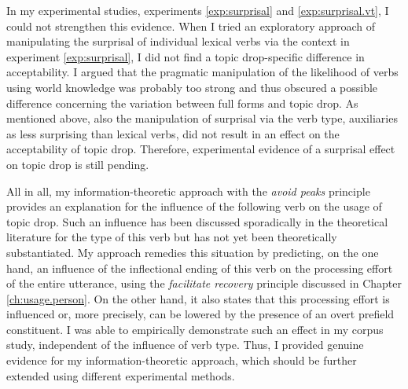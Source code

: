 In my experimental studies, experiments \ref*{exp:surprisal} and \ref*{exp:surprisal.vt}, I could not strengthen this evidence.
When I tried an exploratory approach of manipulating the surprisal of individual lexical verbs via the context in experiment \ref*{exp:surprisal}, I did not find a topic drop-specific difference in acceptability.
I argued that the pragmatic manipulation of the likelihood of verbs using world knowledge was probably too strong and thus obscured a possible difference concerning the variation between full forms and topic drop.
As mentioned above, also the manipulation of surprisal via the verb type, auxiliaries as less surprising than lexical verbs, did not result in an effect on the acceptability of topic drop.  
Therefore, experimental evidence of a surprisal effect on topic drop is still pending.

All in all, my information-theoretic approach with the \textit{avoid peaks} principle provides an explanation for the influence of the following verb on the usage of topic drop.
Such an influence has been discussed sporadically in the theoretical literature for the type of this verb but has not yet been theoretically substantiated.
My approach remedies this situation by predicting, on the one hand, an influence of the inflectional ending of this verb on the processing effort  of the entire utterance, using the \textit{facilitate recovery} principle discussed in Chapter \ref{ch:usage.person}.
On the other hand, it also states that this processing effort  is influenced or, more precisely, can be lowered by the presence of an overt prefield constituent.
I was able to empirically demonstrate such an effect in my corpus study, independent of the influence of verb type.
Thus, I provided genuine evidence for my information-theoretic approach, which should be further extended using different experimental methods.
